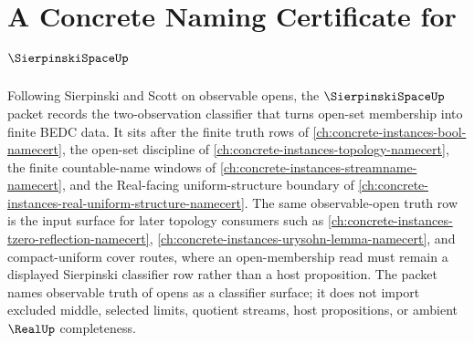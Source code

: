 \chapter{A Concrete Naming Certificate for $\SierpinskiSpaceUp$}
\label{ch:concrete-instances-sierpinski-space-namecert}

Following Sierpinski and Scott on observable opens, the $\SierpinskiSpaceUp$ packet records the two-observation classifier that turns open-set membership into finite BEDC data. It sits after the finite truth rows of \autoref{ch:concrete-instances-bool-namecert}, the open-set discipline of \autoref{ch:concrete-instances-topology-namecert}, the finite countable-name windows of \autoref{ch:concrete-instances-streamname-namecert}, and the Real-facing uniform-structure boundary of \autoref{ch:concrete-instances-real-uniform-structure-namecert}. The same observable-open truth row is the input surface for later topology consumers such as \autoref{ch:concrete-instances-tzero-reflection-namecert}, \autoref{ch:concrete-instances-urysohn-lemma-namecert}, and compact-uniform cover routes, where an open-membership read must remain a displayed Sierpinski classifier row rather than a host proposition. The packet names observable truth of opens as a classifier surface; it does not import excluded middle, selected limits, quotient streams, host propositions, or ambient $\RealUp$ completeness.

